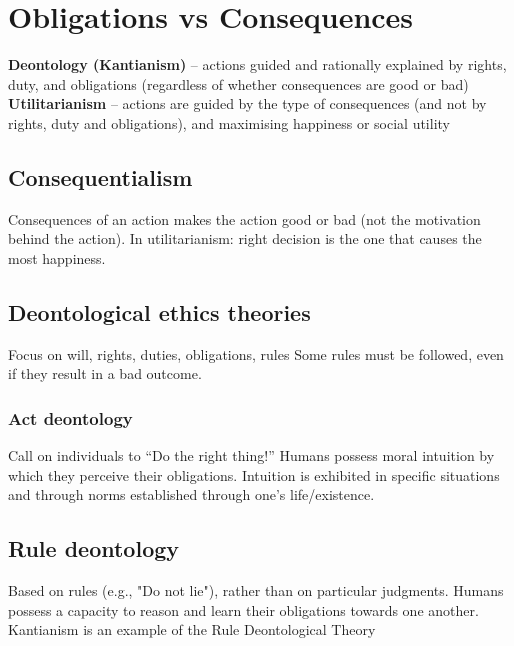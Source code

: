 \documentclass{article}
\begin{document}
\section{Obligations vs Consequences}
\begin{flushleft}
\textbf{Deontology (Kantianism)} – actions guided and rationally explained by rights, duty, and obligations (regardless of whether consequences are good or bad)\\
\textbf{Utilitarianism} – actions are guided by the type of consequences (and not by rights, duty and obligations), and maximising happiness or social utility
\end{flushleft}

\subsection{Consequentialism}
\begin{flushleft}
Consequences of an action makes the action good or bad (not the motivation behind the action). In utilitarianism: right decision is the one that causes the most happiness.
\end{flushleft}

\subsection{Deontological ethics theories}
\begin{flushleft}
Focus on will, rights, duties, obligations, rules Some rules must be followed, even if they result in a bad outcome.
\end{flushleft}

\subsubsection{Act deontology}
\begin{flushleft}
Call on individuals to “Do the right thing!” Humans possess moral intuition by which they perceive their obligations. Intuition is exhibited in specific situations and through norms established through one’s life/existence.
\end{flushleft}

\subsection{Rule deontology}
\begin{flushleft}
Based on rules (e.g., "Do not lie"), rather than on particular judgments. Humans possess a capacity to reason and learn their obligations towards one another. Kantianism is an example of the Rule Deontological Theory
\end{flushleft}
\end{document}
